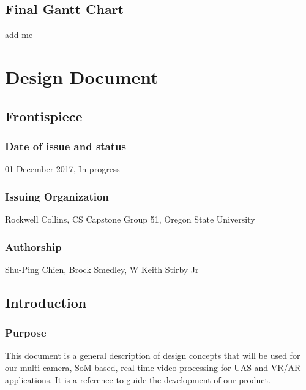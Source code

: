 \documentclass[letterpaper,10pt,serif,draftclsnofoot,onecolumn,compsoc,titlepage]{IEEEtran}
\begin{document}
\subsection{Final Gantt Chart}

add me\\

\newpage 

\section{Design Document}
\subsection{Frontispiece}

\subsubsection{Date of issue and status}

01 December 2017, In-progress \\

\subsubsection{Issuing Organization}

Rockwell Collins, CS Capstone Group 51, Oregon State University \\

\subsubsection{Authorship}

Shu-Ping Chien, Brock Smedley, W Keith Stirby Jr \\

\subsection{Introduction}

\subsubsection{Purpose}

This document is a general description of design concepts that will be used for our 
multi-camera, SoM based, real-time video processing for UAS and VR/AR applications. 
It is a reference to guide the development of our product.  \\
\end{document}
